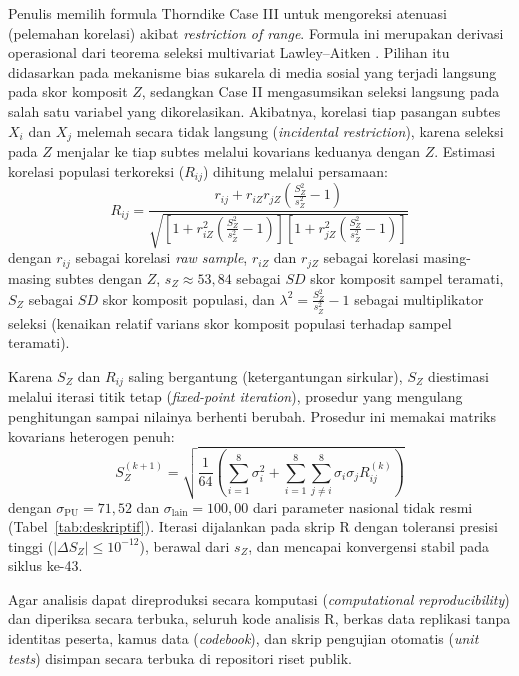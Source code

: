 Penulis memilih formula Thorndike Case III \autocite{thorndike1949,sackett2000} untuk mengoreksi atenuasi (pelemahan korelasi) akibat \textit{restriction of range}. Formula ini merupakan derivasi operasional dari teorema seleksi multivariat Lawley--Aitken \autocite{aitken1934,lawley1943}. Pilihan itu didasarkan pada mekanisme bias sukarela di media sosial yang terjadi langsung pada skor komposit $Z$, sedangkan Case II mengasumsikan seleksi langsung pada salah satu variabel yang dikorelasikan. Akibatnya, korelasi tiap pasangan subtes $X_i$ dan $X_j$ melemah secara tidak langsung (\textit{incidental restriction}), karena seleksi pada $Z$ menjalar ke tiap subtes melalui kovarians keduanya dengan $Z$. Estimasi korelasi populasi terkoreksi ($R_{ij}$) dihitung melalui persamaan:
\begin{equation}
R_{ij} = \frac{r_{ij} + r_{iZ} r_{jZ} \left(\frac{S_Z^2}{s_Z^2} - 1\right)}{\sqrt{\left[1 + r_{iZ}^2 \left(\frac{S_Z^2}{s_Z^2} - 1\right)\right] \left[1 + r_{jZ}^2 \left(\frac{S_Z^2}{s_Z^2} - 1\right)\right]}}
\end{equation}
dengan $r_{ij}$ sebagai korelasi \textit{raw sample}, $r_{iZ}$ dan $r_{jZ}$ sebagai korelasi masing-masing subtes dengan $Z$, $s_Z \approx 53,84$ sebagai $SD$ skor komposit sampel teramati, $S_Z$ sebagai $SD$ skor komposit populasi, dan $\lambda^2 = \frac{S_Z^2}{s_Z^2} - 1$ sebagai multiplikator seleksi (kenaikan relatif varians skor komposit populasi terhadap sampel teramati).

Karena $S_Z$ dan $R_{ij}$ saling bergantung (ketergantungan sirkular), $S_Z$ diestimasi melalui iterasi titik tetap (\textit{fixed-point iteration}), prosedur yang mengulang penghitungan sampai nilainya berhenti berubah. Prosedur ini memakai matriks kovarians heterogen penuh:
\begin{equation}
S_{Z}^{(k+1)} = \sqrt{\frac{1}{64}\left( \sum_{i=1}^8 \sigma_i^2 + \sum_{i=1}^8 \sum_{j \neq i}^8 \sigma_i \sigma_j R_{ij}^{(k)} \right)}
\end{equation}
dengan $\sigma_{\text{PU}} = 71,52$ dan $\sigma_{\text{lain}} = 100,00$ dari parameter nasional tidak resmi (Tabel~\ref{tab:deskriptif}). Iterasi dijalankan pada skrip R dengan toleransi presisi tinggi ($|\Delta S_Z| \le 10^{-12}$), berawal dari $s_Z$, dan mencapai konvergensi stabil pada siklus ke-43.

Agar analisis dapat direproduksi secara komputasi (\textit{computational reproducibility}) dan diperiksa secara terbuka, seluruh kode analisis R, berkas data replikasi tanpa identitas peserta, kamus data (\textit{codebook}), dan skrip pengujian otomatis (\textit{unit tests}) disimpan secara terbuka di repositori riset publik.


